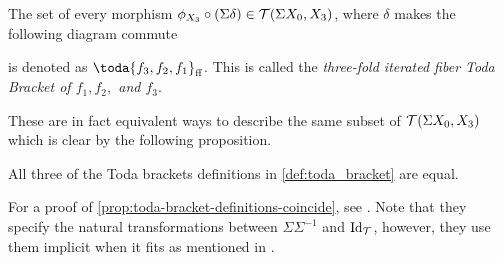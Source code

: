 \begin{definition}
\begin{enumerate}
{            The set of every morphism \( \phi_{X_3} \circ (\Sigma \delta) \in {\mathcal{T}}(\Sigma X_0, X_3) \), where \( \delta \) makes the following diagram commute
            \begin{center}
            \end{center}
            is denoted as \( \toda{f_3, f_2, f_1}_{\ff} \). This is called the \emph{three-fold iterated fiber Toda Bracket of \( f_1, f_2, \) and \( f_3 \)}.
        }
    \end{enumerate}
\end{definition}

These are in fact equivalent ways to describe the same subset of \( {\mathcal{T}}(\Sigma X_0, X_3) \) which is clear by the following proposition.

\begin{proposition}
    \label{prop:toda-bracket-definitions-coincide}
    All three of the Toda brackets definitions in \autoref{def:toda_bracket} are equal.
\end{proposition}

For a proof of \autoref{prop:toda-bracket-definitions-coincide}, see \cite[Proposition 3.3]{Christensen-Frankland_2017}. Note that they specify the natural transformations between \( \Sigma \Sigma^{-1} \) and \( \operatorname{Id}_{{\mathcal{T}}} \), however, they use them implicit when it fits as mentioned in \cite[Section 2, p. 2690]{Christensen-Frankland_2017}.

